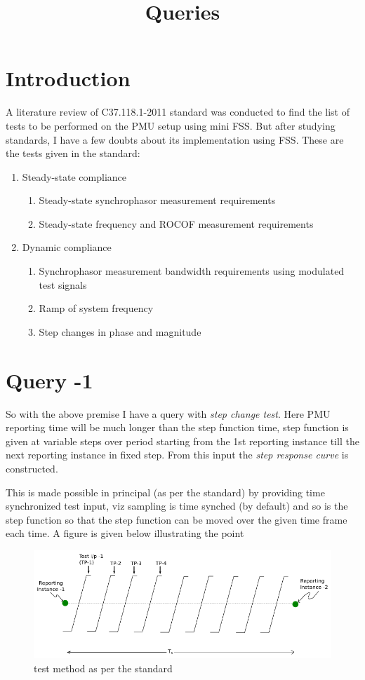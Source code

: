 \documentclass{article}
\title{Queries}
\begin{document}
\section{Introduction}
A literature review of C37.118.1-2011 standard  was conducted to find the list of tests to be performed on the PMU setup using mini FSS. But after studying standards, I have a few doubts about its implementation using FSS. These are the tests given in the standard:
\begin{enumerate}
\item Steady-state compliance
	\begin{enumerate}
	\item Steady-state synchrophasor measurement requirements
	\item Steady-state frequency and ROCOF measurement requirements
	\end{enumerate}
\item Dynamic compliance
	\begin{enumerate}
	\item Synchrophasor measurement bandwidth requirements using modulated test signals
	\item Ramp of system frequency
	\item Step changes in phase and magnitude
	\end{enumerate}
\end{enumerate} 
\section{Query -1}
So with the above premise I have a query with \textit{step change test}. Here PMU reporting time will be much longer than the step function time, step function is given at variable steps over period starting from the 1st reporting instance till the next reporting instance in fixed step. From this input the \textit{step response curve} is constructed.

This is made possible in principal (as per the standard) by providing time synchronized test input, viz sampling is time synched (by default) and so is the step function so that the step function can be moved over the given time frame each time. A figure is given below illustrating the point
\begin{figure}[h]
\centering
\includegraphics[width=\textwidth]{step_explanation.png}
\caption{test method as per the standard}
\end{figure}
\end{document}

